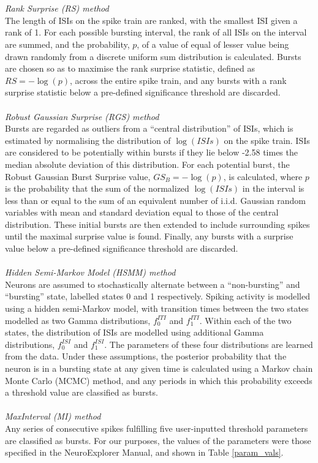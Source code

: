 \documentclass[12pt, titlepage]{article}
\begin{document}
\\ \\ \textit{Rank Surprise (RS) method \cite{Gourevitch2007}}
\\The length of ISIs on the spike train are ranked,  with the smallest ISI given a rank of 1. For each possible bursting interval, the rank of all ISIs on the interval are summed, and the probability, $p$, of a value of equal of lesser value  being drawn randomly from a discrete uniform sum distribution is calculated. Bursts are chosen so as to maximise the rank surprise statistic, defined as $RS=-\log(p)$, across the entire spike train, and any bursts with a rank surprise statistic below a pre-defined significance threshold are discarded\nocite{Gourevitch2007}. 
\\ \\ \textit{Robust Gaussian Surprise (RGS) method \cite{Ko2012}}
\\Bursts are regarded as outliers from a ``central distribution'' of ISIs, which is estimated by normalising the distribution of $\log(ISIs)$ on the spike train. ISIs are considered to be potentially within bursts if they lie below -2.58 times the median absolute deviation of this distribution. For each potential burst, the Robust Gaussian Burst Surprise value, $GS_B=-\log(p)$, is calculated, where $p$ is the probability that the sum of the normalized $\log(ISIs)$ in the interval is less than or equal to the sum of an equivalent number of i.i.d. Gaussian random variables with mean and standard deviation equal to those of the central distribution. These initial bursts are then extended to include surrounding spikes until the maximal surprise value is found. Finally, any bursts with a surprise value below a pre-defined significance threshold are discarded.
\\ \\ \textit{Hidden Semi-Markov Model (HSMM) method \cite{Tokdar2010}}
\\Neurons are assumed to stochastically alternate between a ``non-bursting'' and ``bursting'' state, labelled states 0 and 1 respectively. Spiking activity is modelled using a hidden semi-Markov model, with transition times between the two states modelled as two Gamma distributions,  $f_0^{ITI}$ and $f_1^{ITI}$.  Within each of the two states, the distribution of ISIs are modelled using additional Gamma distributions, $f_0^{ISI}$ and $f_1^{ISI}$. The parameters of these four distributions are learned from the data. Under these assumptions, the posterior probability that the neuron is in a bursting state at any given time is calculated using a Markov chain Monte Carlo (MCMC) method, and any periods in which this probability exceeds a threshold value are classified as bursts.
\\ \\ \textit{MaxInterval (MI) method  \cite{NEmanual}}
\\Any series of consecutive spikes fulfilling five user-inputted threshold parameters are classified as bursts. For our purposes, the values of the parameters were those specified in the NeuroExplorer Manual, and shown in Table \ref{param_vals}.
\end{document}
